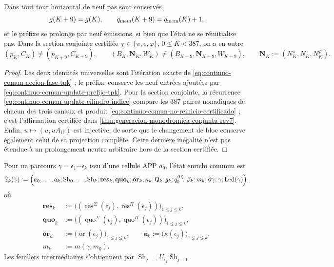 \begin{proposition}
\label{prop:continuo-comun-no-reinicio-alcance}
Dans tout tour horizontal de neuf pas sont conservés
\[
 g(K+9)=g(K),\qquad
 q_{\rm mem}(K+9)=q_{\rm mem}(K)+1,
\]
et le préfixe se prolonge par neuf émissions, si bien que l'état ne se réinitialise pas. Dans la section conjointe certifiée \(\chi\in\{\pi,e,\varphi\}\), \(0\leq K<387\), on a en outre
\begin{equation}
\label{eq:continuo-comun-no-reinicio-certificado}
 (p_K,C_K)\neq(p_{K+9},C_{K+9}),\qquad
 (B_K,\mathbf N_K,W_K)\neq
 (B_{K+9},\mathbf N_{K+9},W_{K+9}),
 \qquad
 \mathbf N_K:=(N_K^\pi,N_K^e,N_K^\varphi).
\end{equation}
\end{proposition}

\begin{proof}
Les deux identités universelles sont l'itération exacte de \eqref{eq:continuo-comun-accion-fase-tpk} ; le préfixe conserve les neuf entrées ajoutées par \eqref{eq:continuo-comun-update-prefijo-tpk}. Pour la section conjointe, la récurrence \eqref{eq:continuo-comun-update-cilindro-indice} compare les \(387\) paires nonadiques de chacun des trois canaux et produit \eqref{eq:continuo-comun-no-reinicio-certificado} ; c'est l'affirmation certifiée dans \cref{thm:generacion-monodromica-conjunta-rev7}. Enfin, \(u\mapsto(u,uA_W)\) est injective, de sorte que le changement de bloc conserve également celui de sa projection complète. Cette dernière inégalité n'est pas étendue à un prolongement neutre arbitraire hors de la section certifiée.
\end{proof}

\begin{definition}
\label{def:continuo-comun-estado}
Pour un parcours \(\gamma=\epsilon_1\cdots\epsilon_k\) issu d'une cellule APP \(a_0\), l'état enrichi commun est
\begin{equation}
\label{eq:continuo-comun-estado}
 \widehat x_k(\gamma):=\Bigl(
  a_0,\ldots,a_k;
  \operatorname{Sh}_0,\ldots,\operatorname{Sh}_k;
  \mathbf{res}_k,\mathbf{quo}_k;
  \mathbf{or}_k,\mathbf\kappa_k;
  \mathsf Q_k;g_k;q^{(9)}_k;\beta_k;m_k;\partial\gamma;\gamma;
  \operatorname{Led}(\gamma)
 \Bigr),
\end{equation}
où
\begin{align*}
 \mathbf{res}_k
 &:=\bigl(
  (\operatorname{res}^{\Sigma}(\epsilon_j),
   \operatorname{res}^{\Pi}(\epsilon_j))
  \bigr)_{1\leq j\leq k},\\
 \mathbf{quo}_k
 &:=\bigl(
  (\operatorname{quo}^{\Sigma}(\epsilon_j),
   \operatorname{quo}^{\Pi}(\epsilon_j))
  \bigr)_{1\leq j\leq k},\\
 \mathbf{or}_k
 &:=\bigl(\operatorname{or}(\epsilon_j)\bigr)_{1\leq j\leq k},
 \qquad
 \mathbf\kappa_k
 :=\bigl(\kappa(\epsilon_j)\bigr)_{1\leq j\leq k},\\
 m_k&:=m(\gamma;m_0).
\end{align*}
Les feuillets intermédiaires s'obtiennent par \(\operatorname{Sh}_{j}=U_{\epsilon_j}\operatorname{Sh}_{j-1}\).
\end{definition}

